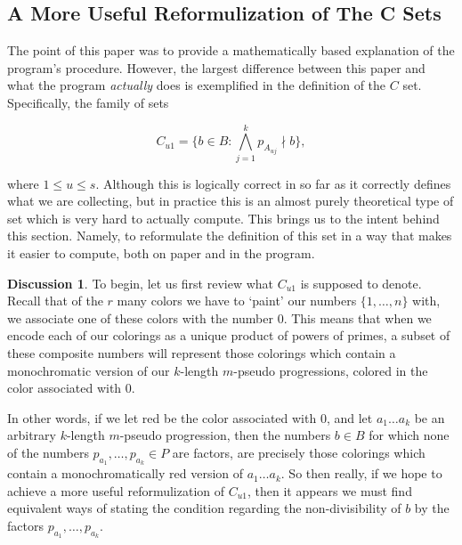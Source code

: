 \documentclass{article}
\theoremstyle{definition}
\theoremstyle{remark}
\theoremstyle{definition}
\newtheorem*{discussion}{Discussion}
\begin{document}
\newpage

\subsection{A More Useful Reformulization of The C Sets}

The point of this paper was to provide a mathematically based explanation of the program's procedure. However, the largest difference between this paper and what the program \textit{actually} does is exemplified in the definition of the $C$ set. Specifically, the family of sets

\begin{equation*}
    C_{u1}=\{b\in B\colon \bigwedge_{j=1}^{k}p_{A_{uj}}\nmid b\},
\end{equation*}


\noindent where $1\leq u\leq s$. Although this is logically correct in so far as it correctly defines what we are collecting, but in practice this is an almost purely theoretical type of set which is very hard to actually compute. This brings us to the intent behind this section. Namely, to reformulate the definition of this set in a way that makes it easier to compute, both on paper and in the program.

\begin{discussion}
    To begin, let us first review what $C_{u1}$ is supposed to denote. Recall that of the $r$ many colors we have to `paint' our numbers $\{1, \dots, n\}$ with, we associate one of these colors with the number 0. This means that when we encode each of our colorings as a unique product of powers of primes, a subset of these composite numbers will represent those colorings which contain a monochromatic version of our $k$-length $m$-pseudo progressions, colored in the color associated with 0.\par  In other words, if we let red be the color associated with 0, and let $a_1\dots a_k$ be an arbitrary $k$-length $m$-pseudo progression, then the numbers $b\in B$ for which none of the numbers $p_{a_1}, \dots, p_{a_k}\in P$ are factors, are precisely those colorings which contain a monochromatically red version of $a_1\dots a_k$. So then really, if we hope to achieve a more useful reformulization of $C_{u1}$, then it appears we must find equivalent ways of stating the condition regarding the non-divisibility of $b$ by the factors $p_{a_1},\dots,p_{a_k}$.
\end{discussion}
\end{document}
